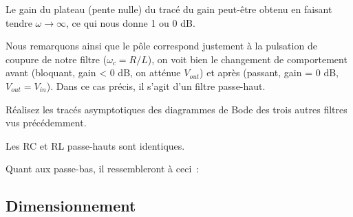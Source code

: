 Le gain du plateau (pente nulle) du tracé du gain peut-être obtenu en faisant tendre $\omega \rightarrow \infty$, ce qui nous donne 1 ou 0 dB.


Nous remarquons ainsi que le pôle correspond justement à la pulsation de coupure de notre filtre ($\omega_c = R/L$), on voit bien le changement de comportement avant (bloquant, gain < 0 dB, on atténue $V_{out}$) et après (passant, gain = 0 dB, $V_{out} = V_{in}$).
Dans ce cas précis, il s'agit d'un filtre passe-haut.

\clearpage

{
Réalisez les tracés asymptotiques des diagrammes de Bode des trois autres filtres vus précédemment.
}
{
  Les RC et RL passe-hauts sont identiques.

  Quant aux passe-bas, il ressembleront à ceci~:

  \begin{center}
  \end{center}
}


\subsection{Dimensionnement}

